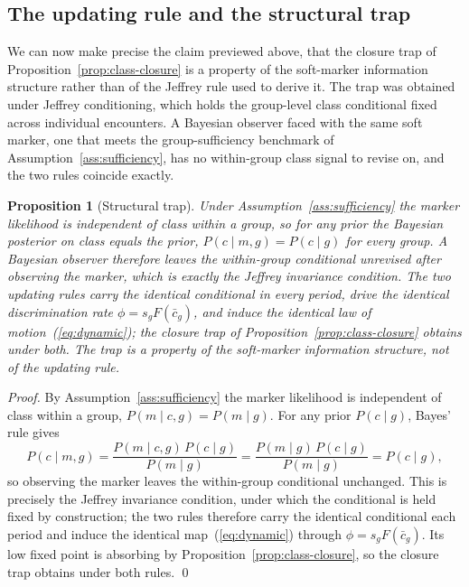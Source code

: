 \documentclass[pdflatex,sn-basic]{sn-jnl}
\theoremstyle{thmstyleone}
\newtheorem{proposition}{Proposition}
\numberwithin{proposition}{subsection}
\begin{document}
\subsection{The updating rule and the structural trap}

We can now make precise the claim previewed above, that the closure trap
of Proposition~\ref{prop:class-closure} is a property of the soft-marker
information structure rather than of the Jeffrey rule used to derive it.
The trap was obtained under Jeffrey conditioning, which holds the
group-level class conditional fixed across individual encounters. A
Bayesian observer faced with the same soft marker, one that meets the
group-sufficiency benchmark of Assumption~\ref{ass:sufficiency}, has no
within-group class signal to revise on, and the two rules coincide
exactly.

\begin{proposition}[Structural trap]
\label{prop:coincidence}
Under Assumption~\ref{ass:sufficiency} the marker likelihood is
independent of class within a group, so for any prior the Bayesian
posterior on class equals the prior, $P(c \mid m, g) = P(c \mid g)$ for
every group. A Bayesian observer therefore leaves the within-group
conditional unrevised after observing the marker, which is exactly the
Jeffrey invariance condition. The two updating rules carry the identical
conditional in every period, drive the identical discrimination rate
$\phi = s_g F(\bar{c}_g)$, and induce the identical law of
motion~(\ref{eq:dynamic}); the closure trap of
Proposition~\ref{prop:class-closure} obtains under both. The trap is a
property of the soft-marker information structure, not of the updating
rule.
\end{proposition}

\begin{proof}
By Assumption~\ref{ass:sufficiency} the marker likelihood is independent
of class within a group, $P(m \mid c, g) = P(m \mid g)$. For any prior
$P(c \mid g)$, Bayes' rule gives
\[
  P(c \mid m, g)
  = \frac{P(m \mid c, g)\,P(c \mid g)}{P(m \mid g)}
  = \frac{P(m \mid g)\,P(c \mid g)}{P(m \mid g)}
  = P(c \mid g),
\]
so observing the marker leaves the within-group conditional unchanged.
This is precisely the Jeffrey invariance condition, under which the
conditional is held fixed by construction; the two rules therefore carry
the identical conditional each period and induce the identical
map~(\ref{eq:dynamic}) through $\phi = s_g F(\bar{c}_g)$. Its low fixed
point is absorbing by Proposition~\ref{prop:class-closure}, so the closure
trap obtains under both rules. \qed
\end{proof}
\end{document}
